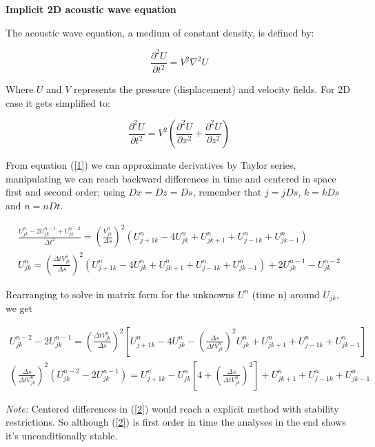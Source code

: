 \documentclass[legalpaper, 12pt]{article}
\begin{document}
\textbf{Implicit 2D acoustic wave equation }

The acoustic wave equation, a medium of constant density, is defined by:

\[ \frac{\partial^2 U}{\partial t^2} = V^2 \nabla^2 U \]

Where $U$ and $V$ represents the pressure (displacement) and velocity fields. For 2D case it gets simplified to:

\begin{equation}
\frac{\partial^2 U}{\partial t^2} = V^2 \left( \frac{\partial^2 U}{\partial x^2}+ \frac{\partial^2 U}{\partial z^2} \right)
\label{1}
\end{equation}

From equation (\ref{1}) we can approximate derivatives by Taylor series, manipulating we can reach backward differences in time and centered in space first and second order; using $Dx=Dz=Ds$, remember that $j=jDs$, $k=kDs$ and $n=nDt$.

\begin{eqnarray}
\frac{U_{jk}^n -2 U_{jk}^{n-1} + U_{jk}^{n-2}}{\Delta t^2} =  \left( \frac{V_{jk}^n}{\Delta s} \right) ^2 \left(  U_{j+1k}^n - 4 U_{jk}^n + U_{jk+1}^n + U_{j-1k}^n + U_{jk-1}^n  \right)
\label{2} \\
U_{jk}^n  =  \left( \frac{\Delta t  V_{jk}^n}{\Delta s} \right) ^2 \left(  U_{j+1k}^n - 4 U_{jk}^n + U_{jk+1}^n + U_{j-1k}^n + U_{jk-1}^n  \right) + 2 U_{jk}^{n-1} - U_{jk}^{n-2} \nonumber
\end{eqnarray}

Rearranging to solve in matrix form for the unknowns $ U^n $ (time n) around $U_{jk}$, we get 

\begin{multline}
 U_{jk}^{n-2} -2 U_{jk}^{n-1} =  \left( \frac{\Delta t  V_{jk}^n}{\Delta s} \right) ^2 \left[  U_{j+1k}^n - 4 U_{jk}^n - \left( \frac{\Delta s}{\Delta t  V_{jk}^n} \right) ^2  U_{jk}^n + U_{jk+1}^n + U_{j-1k}^n + U_{jk-1}^n  \right] \\
\left( \frac{\Delta s}{ \Delta t  V_{jk}^n} \right) ^2 \left( U_{jk}^{n-2} -2 U_{jk}^{n-1} \right) = U_{j+1k}^n - U_{jk}^n \left[ 4+ \left( \frac{\Delta s}{\Delta t  V_{jk}^n} \right) ^2  \right]  + U_{jk+1}^n + U_{j-1k}^n + U_{jk-1}^n \label{3}
\end{multline}

\textit{Note:} Centered differences in  (\ref{2}) would reach a explicit method with stability restrictions. So although (\ref{2}) is first order in time the analyses in the end shows it's unconditionally stable.
\end{document}
